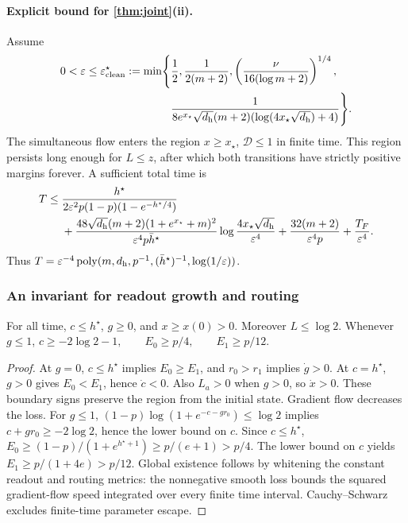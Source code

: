\paragraph{Explicit bound for \cref{thm:joint}(ii).}
Assume
\begin{equation}
 \begin{aligned}
 0<\varepsilon\le\varepsilon^\star_{\mathrm{clean}}:=\min\Biggl\{&\frac12,\frac1{2(m+2)},
 \left(\frac{\nu}{16(\log m+2)}\right)^{1/4},\\
 &\frac1{8e^{x_\star}\sqrt{d_{\mathrm h}}(m+2)(\log(4x_\star\sqrt{d_{\mathrm h}})+4)}\Biggr\}.
 \end{aligned}
 \label{eq:CR-scale}
\end{equation}
The simultaneous flow enters the region $x\ge x_\star$, $\mathcal D\le1$ in finite time. This region persists long enough for $L\le z$, after which both transitions have strictly positive margins forever. A sufficient total time is
\begin{align}
 T\le{}&\frac{h^\star}{2\varepsilon^2 p(1-p)(1-e^{-h^\star/4})}\notag\\
 &+\frac{48\sqrt{d_{\mathrm h}}(m+2)(1+e^{x_\star}+m)^2}{\varepsilon^4p\bar h^\star}
       \log\frac{4x_\star\sqrt{d_{\mathrm h}}}{\varepsilon^4}
 +\frac{32(m+2)}{\varepsilon^4p}+\frac{T_F}{\varepsilon^4}.\label{eq:CR-time}
\end{align}
Thus $T=\varepsilon^{-4}\operatorname{poly}(m,d_{\mathrm h},p^{-1},(\bar h^\star)^{-1},\log(1/\varepsilon))$.

\subsubsection{An invariant for readout growth and routing}
\begin{lemma}
\label{lem:CR-align}
For all time, $c\le h^\star$, $g\ge0$, and $x\ge x(0)>0$. Moreover $L\le\log2$. Whenever $g\le1$,
 $c\ge-2\log2-1,\qquad E_0\ge p/4,\qquad E_1\ge p/12.$ 
\end{lemma}
\begin{proof}
At $g=0$, $c\le h^\star$ implies $E_0\ge E_1$, and $r_0>r_1$ implies $\dot g>0$.
At $c=h^\star$, $g>0$ gives $E_0<E_1$, hence $\dot c<0$. Also $L_a>0$ when $g>0$, so $\dot x>0$.
These boundary signs preserve the region from the initial state. Gradient flow decreases the loss.
For $g\le1$, $(1-p)\log(1+e^{-c-gr_0})\le\log2$ implies $c+gr_0\ge-2\log2$, hence the lower bound on $c$.
Since $c\le h^\star$,
$E_0\ge(1-p)/(1+e^{h^\star+1})\ge p/(e+1)>p/4$.
The lower bound on $c$ yields $E_1\ge p/(1+4e)>p/12$.
Global existence follows by whitening the constant readout and routing metrics: the nonnegative smooth loss bounds the squared gradient-flow speed integrated over every finite time interval. Cauchy--Schwarz excludes finite-time parameter escape.
\end{proof}

